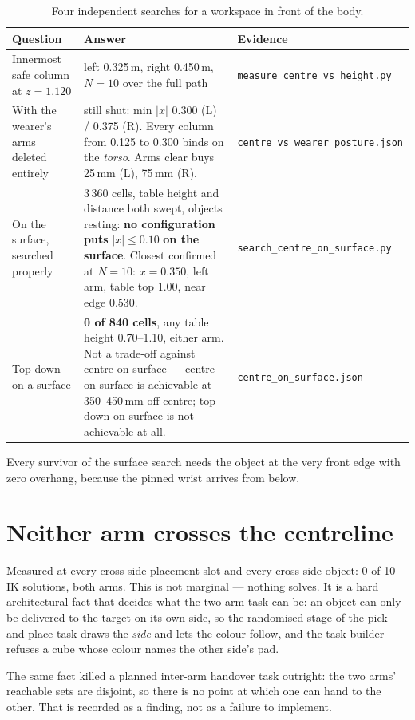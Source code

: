 \documentclass[11pt,a4paper,oneside]{report}
\newcommand{\file}[1]{\texttt{\small #1}}
\begin{document}
\begin{table}[H]
\centering
\small
\begin{tabularx}{\textwidth}{@{}lXl@{}}
\toprule
\textbf{Question} & \textbf{Answer} & \textbf{Evidence} \\
\midrule
Innermost safe column at $z=1.120$ &
left 0.325\,m, right 0.450\,m, $N=10$ over the full path &
\file{measure\_centre\_vs\_height.py} \\
With the wearer's arms deleted entirely &
still shut: min $|x|$ 0.300 (L) / 0.375 (R). Every column from 0.125 to 0.300
binds on the \emph{torso}. Arms clear buys 25\,mm (L), 75\,mm (R). &
\file{centre\_vs\_wearer\_posture.json} \\
On the surface, searched properly &
3\,360 cells, table height and distance both swept, objects resting: \textbf{no
configuration puts} $|x| \le 0.10$ \textbf{on the surface}. Closest confirmed at
$N=10$: $x = 0.350$, left arm, table top 1.00, near edge 0.530. &
\file{search\_centre\_on\_surface.py} \\
Top-down on a surface &
\textbf{0 of 840 cells}, any table height 0.70--1.10, either arm. Not a
trade-off against centre-on-surface --- centre-on-surface is achievable at
350--450\,mm off centre; top-down-on-surface is not achievable at all. &
\file{centre\_on\_surface.json} \\
\bottomrule
\end{tabularx}
\caption{Four independent searches for a workspace in front of the body.}
\end{table}

Every survivor of the surface search needs the object at the very front edge
with zero overhang, because the pinned wrist arrives from below.

\section{Neither arm crosses the centreline}

Measured at every cross-side placement slot and every cross-side object: 0 of
10 IK solutions, both arms. This is not marginal --- nothing solves. It is a
hard architectural fact that decides what the two-arm task can be: an object
can only be delivered to the target on its own side, so the randomised stage of
the pick-and-place task draws the \emph{side} and lets the colour follow, and
the task builder refuses a cube whose colour names the other side's pad.

The same fact killed a planned inter-arm handover task outright: the two arms'
reachable sets are disjoint, so there is no point at which one can hand to the
other. That is recorded as a finding, not as a failure to implement.
\end{document}
